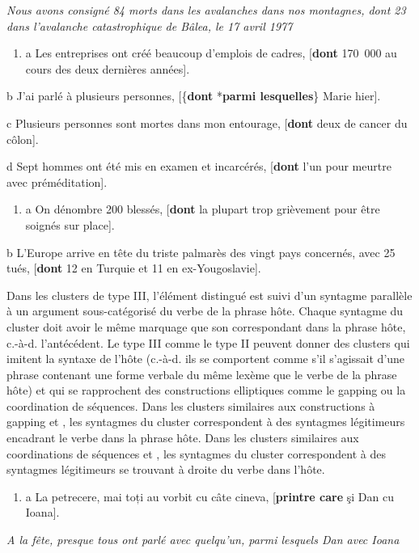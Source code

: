 {\itshape
Nous avons consigné 84 morts dans les avalanches dans nos montagnes, dont 23 dans l'avalanche catastrophique de Bâlea, le 17 avril 1977}


\begin{enumerate}
\item \label{bkm:Ref293337231}a  Les entreprises ont créé beaucoup d'emplois de cadres, [\textbf{dont} 170~000 au cours des deux dernières années].


\end{enumerate}
  b  J'ai parlé à plusieurs personnes, [\{\textbf{dont} {\textbar} *\textbf{parmi lesquelles}\} Marie hier]. 

  c  Plusieurs personnes sont mortes dans mon entourage, [\textbf{dont} deux de cancer du côlon].

  d  Sept hommes ont été mis en examen et incarcérés, [\textbf{dont} l'un pour meurtre avec préméditation].


\begin{enumerate}
\item \label{bkm:Ref293351072}a  On dénombre 200 blessés, [\textbf{dont} la plupart trop grièvement pour être soignés sur place]. 


\end{enumerate}
  b  L'Europe arrive en tête du triste palmarès des vingt pays concernés, avec 25 tués, [\textbf{dont} 12 en Turquie et 11 en ex-Yougoslavie]. 

Dans les clusters de type III, l'élément distingué est suivi d'un syntagme parallèle à un argument sous-catégorisé du verbe de la phrase hôte. Chaque syntagme du cluster doit avoir le même marquage que son correspondant dans la phrase hôte, c.-à-d. l'antécédent. Le type III comme le type II peuvent donner des clusters qui imitent la syntaxe de l'hôte (c.-à-d. ils se comportent comme s'il s'agissait d'une phrase contenant une forme verbale du même lexème que le verbe de la phrase hôte) et qui se rapprochent des constructions elliptiques comme le gapping ou la coordination de séquences. Dans les clusters similaires aux constructions à gapping  et , les syntagmes du cluster correspondent à des syntagmes légitimeurs encadrant le verbe dans la phrase hôte. Dans les clusters similaires aux coordinations de séquences  et , les syntagmes du cluster correspondent à des syntagmes légitimeurs se trouvant à droite du verbe dans l'hôte.


\begin{enumerate}
\item \label{bkm:Ref293353980}a  La petrecere, mai toți au vorbit cu câte cineva, [\textbf{printre care} şi Dan cu Ioana]. 


\end{enumerate}
{\itshape
A la fête, presque tous ont parlé avec quelqu'un, parmi lesquels Dan avec Ioana}

